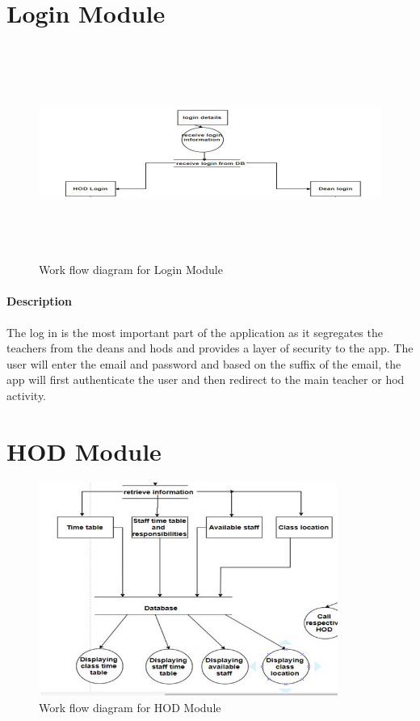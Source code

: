 \documentclass[BTech]{srmuthesis}
\begin{document}
\section{Login Module}
\begin{figure}[htbp]
	\centering
	\includegraphics[width=\linewidth, height=7cm,keepaspectratio]{loginmodule}
	\caption{Work flow diagram for Login Module}
	\label{fig:loginmodule}
\end{figure} 
\paragraph{Description}
The log in is the most important part of the application as it segregates the teachers from the deans and hods and provides a layer of security to the app. The user will enter the email and password and based on the suffix of the email, the app will first authenticate the user and then redirect to the main teacher or hod activity.
\section{HOD Module}
\begin{figure}[htbp]
	\centering
	\includegraphics[width=\linewidth, height=7cm,keepaspectratio]{hodmodule}
	\caption{Work flow diagram for HOD Module}
	\label{fig:hodmodule}
\end{figure} 
\end{document}
